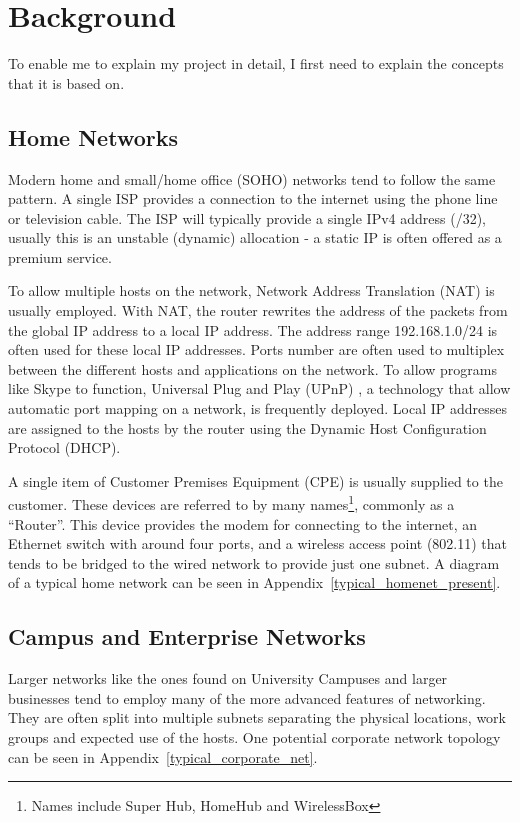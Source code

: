 \documentclass[12pt]{report}
\begin{document}
\chapter{Background}
To enable me to explain my project in detail, I first need to explain the
concepts that it is based on.

\section{Home Networks}
Modern home and small/home office (SOHO)  networks tend to follow the same pattern. A single ISP provides a
connection to the internet using the phone line or television cable.  The ISP
will typically provide a single IPv4 address (/32), usually this is an unstable
(dynamic) allocation - a static IP is often offered as a premium service. 

To allow multiple hosts on the network, Network Address Translation (NAT)
 is usually employed. With NAT,
the router rewrites the address of the packets from the global IP address to a
local IP address. The address range 192.168.1.0/24 is often used for these
local IP addresses. Ports number are often used to multiplex between the
different hosts and applications on the network. To allow programs like Skype
to function, Universal Plug and Play (UPnP) , a technology that allow automatic port mapping on a network, is
frequently deployed. Local IP addresses are assigned to the hosts by the router
using the Dynamic Host Configuration Protocol (DHCP). 

A single item of Customer Premises Equipment (CPE)  is usually supplied to the customer. These devices are
referred to by many names\footnote{Names include Super Hub, HomeHub and
WirelessBox}, commonly as a ``Router''.  This device provides the modem for
connecting to the internet, an Ethernet switch with around four ports, and a
wireless access point (802.11) that tends to be bridged to the wired network to
provide just one subnet. A diagram of a typical home network can be seen in
Appendix~\ref{typical_homenet_present}.

\section{Campus and Enterprise Networks}
Larger networks like the ones found on University Campuses and larger
businesses tend to employ many of the more advanced features of networking.
They are often split into multiple subnets separating the physical locations,
work groups and expected use of the hosts. One potential corporate network
topology can be seen in Appendix~\ref{typical_corporate_net}.
\end{document}
